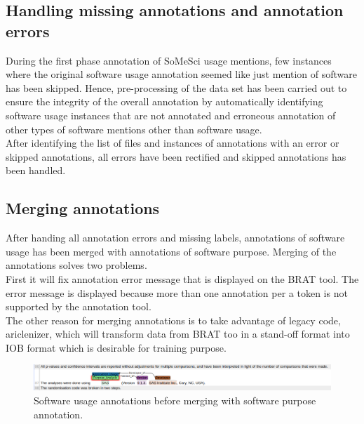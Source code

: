 \subsection{Handling missing annotations and annotation errors }
\label{subsec:dataset:preprocessing:handlingerrors}

During the first phase  annotation of SoMeSci usage mentions, few instances where  the original software usage annotation seemed like just mention of software has been skipped. Hence, pre-processing of the data set has been carried out to ensure the integrity of the overall annotation by automatically identifying software usage instances that are not annotated and erroneous annotation of other types of software mentions other than software usage. \\

After identifying the list of files and instances of annotations with an error or skipped annotations, all errors have been rectified and skipped annotations has been handled.


\subsection{Merging annotations}
\label{subsec:dataset:preprocessing:Merging}


After handing all annotation errors and missing labels, annotations of software usage has been merged with annotations of software purpose. Merging of the annotations solves two problems. \\

First it will fix annotation error message that is displayed on the BRAT tool. The error message is displayed because more than one annotation per a token is not supported by the annotation tool. \\

The other reason for merging annotations is to take advantage of legacy code, ariclenizer, which will transform data from BRAT too in a stand-off format  into IOB format which is desirable for training purpose. 

\begin{figure}[htbp]
	\centering
	\includegraphics[width=.95\textwidth]{4.graphics/figures/chap4/merging/2002515_plm_unm}
	\caption{Software usage annotations before merging with software purpose  annotation.}
	
	\label{fig:chapter04:setup}
\end{figure}

